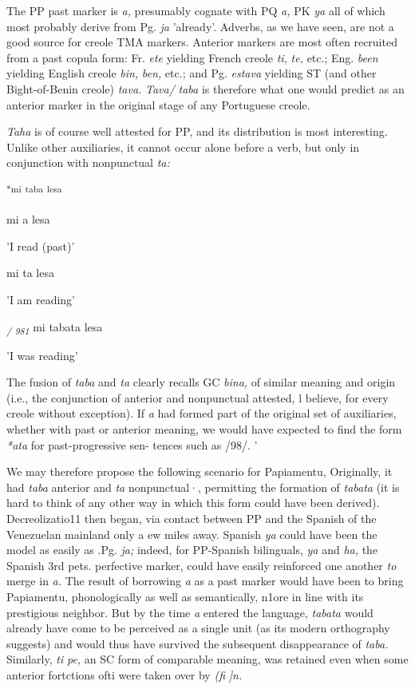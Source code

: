 The PP past marker is \textit{a,} presumably cognate with PQ \textit{a,} PK \textit{ya} all of which most probably derive from Pg. \textit{ja }'already'. Adverbs, as we have seen, are not a good source for creole TMA markers. Anterior markers are most often recruited from a past copula form: Fr. \textit{ete}
yielding French creole \textit{ti,} \textit{te,} etc.; Eng. \textit{been} yielding English creole \textit{bin,} \textit{ben,} etc.; and Pg. \textit{estava} yielding ST (and other Bight-of-Benin creole) \textit{tava.} \textit{Tava/} \textit{taba} is therefore what one would predict as an anterior marker in the original stage of any Portuguese creole.

\textit{Taha} is of course well attested for PP, and its distribution is most
interesting. Unlike other auxiliaries, it cannot occur alone before a verb, but only in conjunction with nonpunctual \textit{ta:}

\ea\label{ex:95}
 \textsuperscript{*mi} \textsuperscript{taba} \textsuperscript{lesa}
\glt
\z

\ea\label{ex:96}
mi a lesa
\glt
\z

'I read (past)'

\ea\label{ex:97}
mi ta lesa
\glt
\z

'I am reading'

\textit{\textsubscript{/}}\textsubscript{ }\textit{\textsubscript{981 }}mi tabata lesa

'I was reading'

The fusion of \textit{taba} and \textit{ta} clearly recalls GC \textit{bina,} of similar meaning and origin (i.e., the conjunction of anterior and nonpunctual attested, l believe, for every creole without exception). If \textit{a} had formed part of the original set of auxiliaries, whether with past or anterior meaning, we would have expected to find the form \textit{*ata} for past-progressive sen- tences such as /98/. '


We may therefore propose the following scenario for Papia\-mentu, Originally, it had \textit{taba} anterior and \textit{ta} nonpunctual·, permitting the formation of \textit{tabata} (it is hard to think of any other way in which this form could have been derived). Decreolizatio11 then began, via contact between PP and the Spanish of the Venezuelan mainland only a ew miles away. Spanish \textit{ya }could have been the model as easily as .Pg. \textit{ja;} indeed, for PP-Spanish bilinguals, \textit{ya }and \textit{ha,} the Spanish 3rd pets. perfective marker, could have easily reinforced one another \textit{to} merge in \textit{a.} The result of borrowing \textit{a} as a past marker would have been to bring Papiamentu, phonologically as well as semantically, n1ore in line with its prestigious neighbor. But by the time \textit{a} entered the language, \textit{tabata} would already have come to be perceived as a single unit (as its modern orthography suggests) and would thus have survived the subsequent disappearance of \textit{taba. }Similarly, \textit{ti} \textit{pe, }an SC form of comparable meaning, was retained even when some anterior fortctions ofti were taken over by \textit{(}\textit{fi} \textit{]n.}

